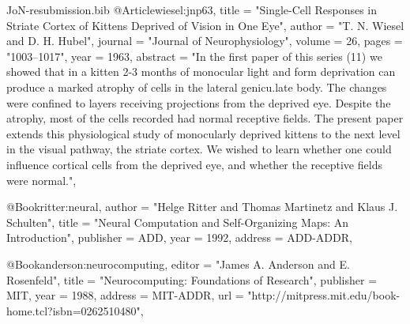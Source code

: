 \documentclass{article}
\begin{document}
\begin{filecontents}{JoN-resubmission.bib}
@Article{wiesel:jnp63,
  title        = "Single-Cell Responses in Striate Cortex of Kittens
                  Deprived of Vision in One Eye",
  author       = "T. N. Wiesel and D. H. Hubel",
  journal      = "Journal of Neurophysiology",
  volume       = 26,
  pages        = "1003--1017",
  year         = 1963,
  abstract     = "In the first paper of this series (11) we showed
                  that in a kitten 2-3 months of monocular light and
                  form deprivation can produce a marked atrophy of
                  cells in the lateral genicu.late body. The changes
                  were confined to layers receiving projections from
                  the deprived eye. Despite the atrophy, most of the
                  cells recorded had normal receptive fields. The
                  present paper extends this physiological study of
                  monocularly deprived kittens to the next level in
                  the visual pathway, the striate cortex. We wished to
                  learn whether one could influence cortical cells
                  from the deprived eye, and whether the receptive
                  fields were normal.",
}

@Book{ritter:neural,
  author       = "Helge Ritter and Thomas Martinetz and Klaus
                  J. Schulten",
  title	       = "Neural Computation and Self-Organizing Maps: {A}n
                  Introduction",
  publisher    = ADD,
  year	       = 1992,
  address      = ADD-ADDR,
}

@Book{anderson:neurocomputing,
  editor       = "James A. Anderson and E. Rosenfeld",
  title	       = "Neurocomputing: {F}oundations of Research",
  publisher    = MIT,
  year	       = 1988,
  address      = MIT-ADDR,
  url	       = "http://mitpress.mit.edu/book-home.tcl?isbn=0262510480",
}
\end{filecontents}


\end{document}
